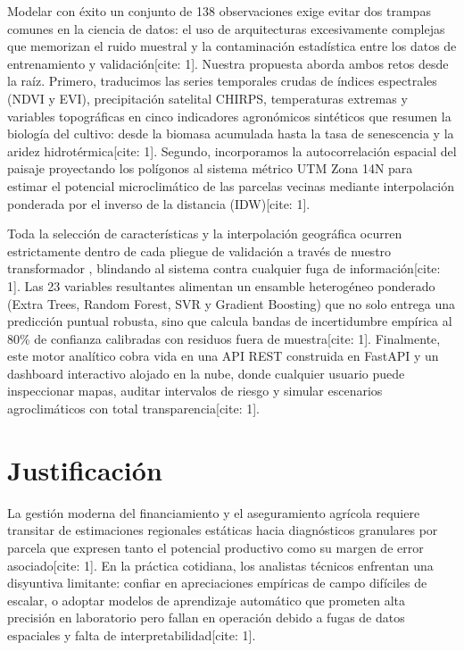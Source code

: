 \documentclass[11pt,a4paper]{article}
\newcommand{\code}[1]{\tcbox[on line, boxsep=1pt, left=3pt, right=3pt, top=1pt, bottom=1pt, colback=mintsoft, colframe=mintsoft, arc=2pt]{\texttt{\footnotesize\color{forestdeep}#1}}}
\begin{document}
Modelar con éxito un conjunto de 138 observaciones exige evitar dos trampas comunes en la ciencia de datos: el uso de arquitecturas excesivamente complejas que memorizan el ruido muestral y la contaminación estadística entre los datos de entrenamiento y validación[cite: 1]. Nuestra propuesta aborda ambos retos desde la raíz. Primero, traducimos las series temporales crudas de índices espectrales (NDVI y EVI), precipitación satelital CHIRPS, temperaturas extremas y variables topográficas en cinco indicadores agronómicos sintéticos que resumen la biología del cultivo: desde la biomasa acumulada hasta la tasa de senescencia y la aridez hidrotérmica[cite: 1]. Segundo, incorporamos la autocorrelación espacial del paisaje proyectando los polígonos al sistema métrico UTM Zona 14N para estimar el potencial microclimático de las parcelas vecinas mediante interpolación ponderada por el inverso de la distancia (IDW)[cite: 1].

Toda la selección de características y la interpolación geográfica ocurren estrictamente dentro de cada pliegue de validación a través de nuestro transformador \code{LeakFreeSmartPearsonIDW}, blindando al sistema contra cualquier fuga de información[cite: 1]. Las 23 variables resultantes alimentan un ensamble heterogéneo ponderado (Extra Trees, Random Forest, SVR y Gradient Boosting) que no solo entrega una predicción puntual robusta, sino que calcula bandas de incertidumbre empírica al 80\% de confianza calibradas con residuos fuera de muestra[cite: 1]. Finalmente, este motor analítico cobra vida en una API REST construida en FastAPI y un dashboard interactivo alojado en la nube, donde cualquier usuario puede inspeccionar mapas, auditar intervalos de riesgo y simular escenarios agroclimáticos con total transparencia[cite: 1].

\section{Justificación}
La gestión moderna del financiamiento y el aseguramiento agrícola requiere transitar de estimaciones regionales estáticas hacia diagnósticos granulares por parcela que expresen tanto el potencial productivo como su margen de error asociado[cite: 1]. En la práctica cotidiana, los analistas técnicos enfrentan una disyuntiva limitante: confiar en apreciaciones empíricas de campo difíciles de escalar, o adoptar modelos de aprendizaje automático que prometen alta precisión en laboratorio pero fallan en operación debido a fugas de datos espaciales y falta de interpretabilidad[cite: 1].
\end{document}
